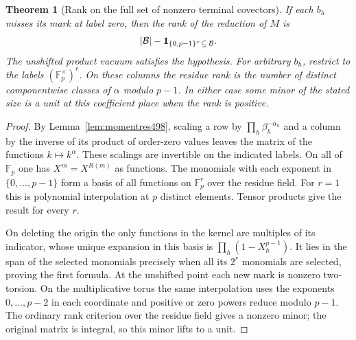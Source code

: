 \documentclass[a4paper,11pt]{article}
\newtheorem{theorem}[proposition]{Theorem}
\theoremstyle{definition}
\theoremstyle{remark}
\numberwithin{equation}{section}
\begin{document}
\begin{theorem}[Rank on the full set of nonzero terminal covectors]\leavevmode
\label{thm:puncturedrank498}
If each \(b_h\) misses its mark at label zero, then the rank of
the reduction of \(M\) is
\[
        |\mathcal B|-
          {\bf1}_{\{0,p-1\}^{r}\,\subseteq\,\mathcal B}.
\]
The unshifted product vacuum satisfies the hypothesis. For
arbitrary \(b_h\), restrict to the labels
\((\mathbb F_p^\times)^r\). On these columns the residue rank
is the number of distinct componentwise classes of \(\alpha\)
modulo \(p-1\). In either case some minor of the stated size
is a unit at this coefficient place when the rank is positive.
\end{theorem}
\begin{proof}
By Lemma~\ref{lem:momentres498}, scaling a row by
\(\prod_h\beta_h^{-\alpha_h}\) and a column by the inverse
of its product of order-zero values leaves the matrix of the
functions \(k\mapsto k^\alpha\). These scalings are invertible
on the indicated labels. On all of \(\mathbb F_p\) one has
\(X^m=X^{R(m)}\) as functions. The monomials with each exponent
in \(\{0,\ldots,p-1\}\) form a basis of all functions on
\(\mathbb F_p^r\) over the residue field. For \(r=1\) this is
polynomial interpolation at \(p\) distinct elements. Tensor
products give the result for every \(r\).

On deleting the origin the only functions in the kernel are
multiples of its indicator, whose unique expansion in this
basis is \(\prod_h(1-X_h^{p-1})\).
It lies in the span of the selected monomials precisely when
all its \(2^r\) monomials are selected, proving the first
formula. At the unshifted point each new mark is nonzero
two-torsion. On the multiplicative torus the same interpolation
uses the exponents \(0,\ldots,p-2\) in each coordinate and
positive or zero powers reduce modulo \(p-1\). The ordinary
rank criterion over the residue field gives a nonzero minor;
the original matrix is integral, so this minor lifts to a unit.
\end{proof}
\end{document}
